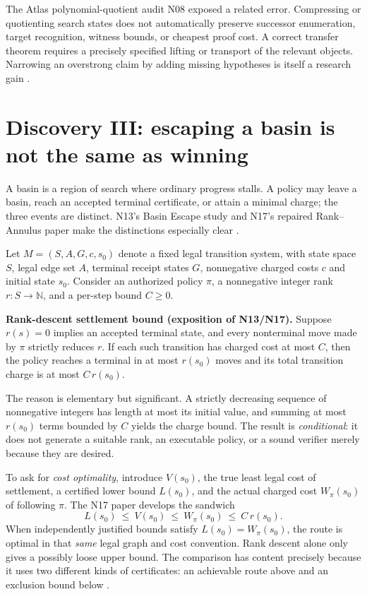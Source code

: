 \documentclass[11pt,letterpaper,oneside]{article}
\begin{document}
The Atlas polynomial-quotient audit N08 exposed a related error. Compressing or quotienting search states does not automatically preserve successor enumeration, target recognition, witness bounds, or cheapest proof cost. A correct transfer theorem requires a precisely specified lifting or transport of the relevant objects. Narrowing an overstrong claim by adding missing hypotheses is itself a research gain \cite{checkpoint}.

\section{Discovery III: escaping a basin is not the same as winning}
A basin is a region of search where ordinary progress stalls. A policy may leave a basin, reach an accepted terminal certificate, or attain a minimal charge; the three events are distinct. N13's Basin Escape study and N17's repaired Rank--Annulus paper make the distinctions especially clear \cite{checkpoint,n17}.

Let $M=(S,A,G,c,s_0)$ denote a fixed legal transition system, with state space $S$, legal edge set $A$, terminal receipt states $G$, nonnegative charged costs $c$ and initial state $s_0$. Consider an authorized policy $\pi$, a nonnegative integer rank $r:S\to\mathbb N$, and a per-step bound $C\ge 0$.

\begin{mathresult}
\textbf{Rank-descent settlement bound (exposition of N13/N17).} Suppose $r(s)=0$ implies an accepted terminal state, and every nonterminal move made by $\pi$ strictly reduces $r$. If each such transition has charged cost at most $C$, then the policy reaches a terminal in at most $r(s_0)$ moves and its total transition charge is at most $C\,r(s_0)$.
\end{mathresult}

The reason is elementary but significant. A strictly decreasing sequence of nonnegative integers has length at most its initial value, and summing at most $r(s_0)$ terms bounded by $C$ yields the charge bound. The result is \emph{conditional}: it does not generate a suitable rank, an executable policy, or a sound verifier merely because they are desired.

To ask for \emph{cost optimality}, introduce $V(s_0)$, the true least legal cost of settlement, a certified lower bound $L(s_0)$, and the actual charged cost $W_{\pi}(s_0)$ of following $\pi$. The N17 paper develops the sandwich
\[
 \boxed{L(s_0)\ \le\ V(s_0)\ \le\ W_{\pi}(s_0)\ \le\ C\,r(s_0).}
\]
When independently justified bounds satisfy $L(s_0)=W_{\pi}(s_0)$, the route is optimal in that \emph{same} legal graph and cost convention. Rank descent alone only gives a possibly loose upper bound. The comparison has content precisely because it uses two different kinds of certificates: an achievable route above and an exclusion bound below \cite{n17}.
\end{document}
